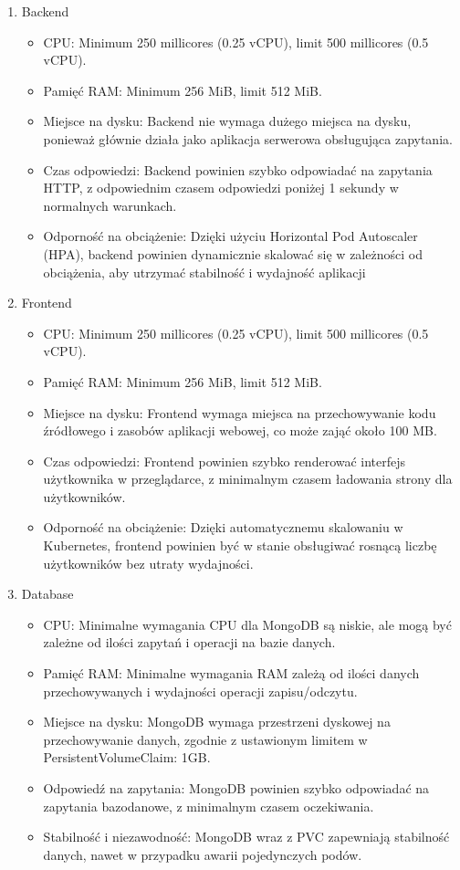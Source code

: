 \documentclass[12pt,a4paper]{article}
\begin{document}
\begin{enumerate}
    \item Backend
        \begin{itemize}
            \item CPU: Minimum 250 millicores (0.25 vCPU), limit 500 millicores (0.5 vCPU).
            \item Pamięć RAM: Minimum 256 MiB, limit 512 MiB.
            \item Miejsce na dysku: Backend nie wymaga dużego miejsca na dysku, ponieważ głównie działa jako aplikacja serwerowa obsługująca zapytania.
            \item Czas odpowiedzi: Backend powinien szybko odpowiadać na zapytania HTTP, z odpowiednim czasem odpowiedzi poniżej 1 sekundy w normalnych warunkach.
            \item Odporność na obciążenie: Dzięki użyciu Horizontal Pod Autoscaler (HPA), backend powinien dynamicznie skalować się w zależności od obciążenia, aby utrzymać stabilność i wydajność aplikacji
        \end{itemize}
    \item Frontend
            \begin{itemize}
            \item CPU: Minimum 250 millicores (0.25 vCPU), limit 500 millicores (0.5 vCPU).
            \item Pamięć RAM: Minimum 256 MiB, limit 512 MiB.
            \item Miejsce na dysku: Frontend wymaga miejsca na przechowywanie kodu źródłowego i zasobów aplikacji webowej, co może zająć około 100 MB.
            \item Czas odpowiedzi: Frontend powinien szybko renderować interfejs użytkownika w przeglądarce, z minimalnym czasem ładowania strony dla użytkowników.
            \item Odporność na obciążenie: Dzięki automatycznemu skalowaniu w Kubernetes, frontend powinien być w stanie obsługiwać rosnącą liczbę użytkowników bez utraty wydajności.
        \end{itemize}
    \item Database
                \begin{itemize}
            \item CPU: Minimalne wymagania CPU dla MongoDB są niskie, ale mogą być zależne od ilości zapytań i operacji na bazie danych.
            \item Pamięć RAM: Minimalne wymagania RAM zależą od ilości danych przechowywanych i wydajności operacji zapisu/odczytu.
            \item Miejsce na dysku: MongoDB wymaga przestrzeni dyskowej na przechowywanie danych, zgodnie z ustawionym limitem w PersistentVolumeClaim: 1GB.
            \item Odpowiedź na zapytania: MongoDB powinien szybko odpowiadać na zapytania bazodanowe, z minimalnym czasem oczekiwania.
            \item Stabilność i niezawodność: MongoDB wraz z PVC zapewniają stabilność danych, nawet w przypadku awarii pojedynczych podów.
        \end{itemize}
\end{enumerate}
\end{document}
